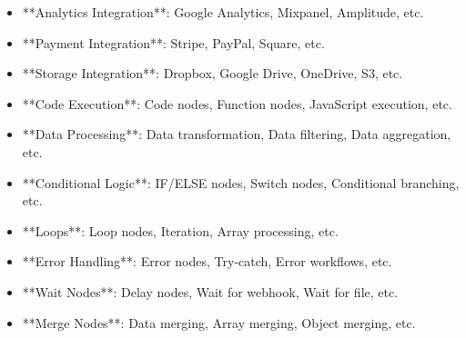 \documentclass[11pt,a4paper]{article}
\begin{document}
\begin{itemize}
\item **Analytics Integration**: Google Analytics, Mixpanel, Amplitude, etc.
\end{itemize}

\begin{itemize}
\item **Payment Integration**: Stripe, PayPal, Square, etc.
\end{itemize}

\begin{itemize}
\item **Storage Integration**: Dropbox, Google Drive, OneDrive, S3, etc.
\end{itemize}

\begin{itemize}
\item **Code Execution**: Code nodes, Function nodes, JavaScript execution, etc.
\end{itemize}

\begin{itemize}
\item **Data Processing**: Data transformation, Data filtering, Data aggregation, etc.
\end{itemize}

\begin{itemize}
\item **Conditional Logic**: IF/ELSE nodes, Switch nodes, Conditional branching, etc.
\end{itemize}

\begin{itemize}
\item **Loops**: Loop nodes, Iteration, Array processing, etc.
\end{itemize}

\begin{itemize}
\item **Error Handling**: Error nodes, Try-catch, Error workflows, etc.
\end{itemize}

\begin{itemize}
\item **Wait Nodes**: Delay nodes, Wait for webhook, Wait for file, etc.
\end{itemize}

\begin{itemize}
\item **Merge Nodes**: Data merging, Array merging, Object merging, etc.
\end{itemize}
\end{document}
